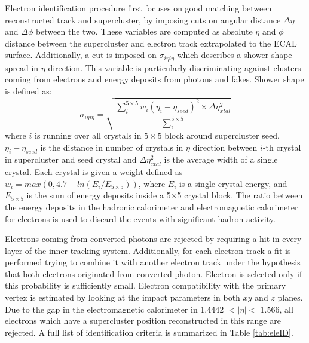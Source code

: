 Electron identification procedure first focuses on good matching between reconstructed track and supercluster, by imposing cuts on angular distance $\Delta \eta$ and $\Delta \phi$ between the two. These variables are computed as absolute $\eta$ and $\phi$ distance between the supercluster and electron track extrapolated to the ECAL surface. Additionally, a cut is imposed on $\sigma_{i\eta i\eta}$ which describes a shower shape spread in $\eta$ direction. This variable is particularly discriminating against clusters coming from electrons and energy deposits from photons and fakes. Shower shape is defined as:
\begin{equation}
\sigma_{i\eta i\eta} = \sqrt{\frac{\sum_{i}^{5\times 5} w_i(\eta_i-\eta_{seed})^2\times \Delta \eta^2_{xtal} }{\sum_{i}^{5\times 5}}}
\end{equation}
where $i$ is running over all crystals in $5\times5$ block around supercluster seed, $\eta_i-\eta_{seed}$ is the distance in number of crystals in $\eta$ direction between $i$-th crystal in supercluster and seed crystal and $\Delta \eta^2_{xtal}$ is the average width of a single crystal. Each crystal is given a weight defined as $w_i=max(0,4.7+ln(E_i/E_{5\times5}))$, where $E_i$ is a single crystal energy, and $E_{5\times 5}$ is the sum of energy deposits inside a 5$\times$5 crystal block. 
The ratio between the energy deposits in the hadronic calorimeter and electromagnetic calorimeter for electrons is used to discard the events with significant hadron activity.
\par Electrons coming from converted photons are rejected by requiring a hit in every layer of the inner tracking system. Additionally, for each electron track a fit is performed trying to combine it with another electron track under the hypothesis that both electrons originated from converted photon. Electron is selected only if this probability is sufficiently small. Electron compatibility with the primary vertex is estimated by looking at the impact parameters in both $xy$ and $z$ planes. Due to the gap in the electromagnetic calorimeter in 1.4442 $< |\eta| <$ 1.566, all electrons which have a supercluster position reconstructed in this range are rejected. A full list of identification criteria is summarized in Table \ref{tab:eleID}.
